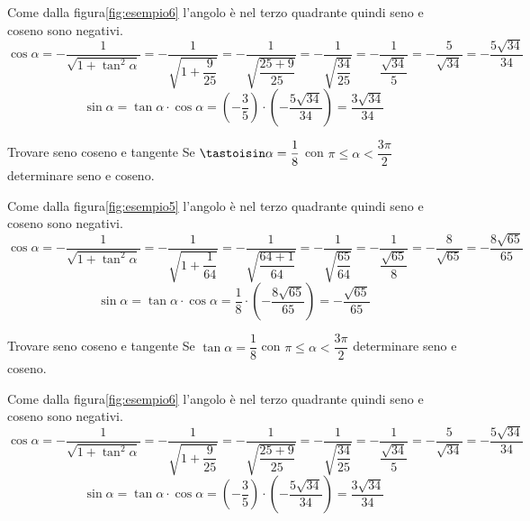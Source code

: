 Come dalla figura\nobs\vref{fig:esempio6} l'angolo è nel terzo quadrante quindi seno e coseno sono negativi.
\[\cos\alpha=-\dfrac{1}{\sqrt{1+\tan^2\alpha}}=-\dfrac{1}{\sqrt{1+\dfrac{9}{25}}}=-\dfrac{1}{\sqrt{\dfrac{25+9}{25}}}=-\dfrac{1}{\sqrt{\dfrac{34}{25}}}=-\dfrac{1}{\dfrac{\sqrt{34}}{5}}=-\dfrac{5}{\sqrt{34}}=-\dfrac{5\sqrt{34}}{34} \]
\[\sin\alpha=\tan\alpha\cdot\cos\alpha=\left(-\dfrac{3}{5}\right)\cdot\left(-\dfrac{5\sqrt{34}}{34}\right)=\dfrac{3\sqrt{34}}{34} \]
\begin{esempiot}{Trovare seno coseno e tangente}{}
	Se $\tastoisin\alpha=\dfrac{1}{8}$ con $\pi\leq\alpha<\dfrac{3\pi}{2}$ determinare seno e coseno.
\end{esempiot}
Come dalla figura\nobs\vref{fig:esempio5} l'angolo è nel terzo quadrante quindi seno e coseno sono negativi.
\[\cos\alpha=-\dfrac{1}{\sqrt{1+\tan^2\alpha}}=-\dfrac{1}{\sqrt{1+\dfrac{1}{64}}}=-\dfrac{1}{\sqrt{\dfrac{64+1}{64}}}=-\dfrac{1}{\sqrt{\dfrac{65}{64}}}=-\dfrac{1}{\dfrac{\sqrt{65}}{8}}=-\dfrac{8}{\sqrt{65}}=-\dfrac{8\sqrt{65}}{65} \]
\[\sin\alpha=\tan\alpha\cdot\cos\alpha=\dfrac{1}{8}\cdot\left(-\dfrac{8\sqrt{65}}{65}\right)=-\dfrac{\sqrt{65}}{65} \]
\begin{esempiot}{Trovare seno coseno e tangente}{}
	Se $\tan\alpha=\dfrac{1}{8}$ con $\pi\leq\alpha<\dfrac{3\pi}{2}$ determinare seno e coseno.
\end{esempiot}
Come dalla figura\nobs\vref{fig:esempio6} l'angolo è nel terzo quadrante quindi seno e coseno sono negativi.
\[\cos\alpha=-\dfrac{1}{\sqrt{1+\tan^2\alpha}}=-\dfrac{1}{\sqrt{1+\dfrac{9}{25}}}=-\dfrac{1}{\sqrt{\dfrac{25+9}{25}}}=-\dfrac{1}{\sqrt{\dfrac{34}{25}}}=-\dfrac{1}{\dfrac{\sqrt{34}}{5}}=-\dfrac{5}{\sqrt{34}}=-\dfrac{5\sqrt{34}}{34} \]
\[\sin\alpha=\tan\alpha\cdot\cos\alpha=\left(-\dfrac{3}{5}\right)\cdot\left(-\dfrac{5\sqrt{34}}{34}\right)=\dfrac{3\sqrt{34}}{34} \]
